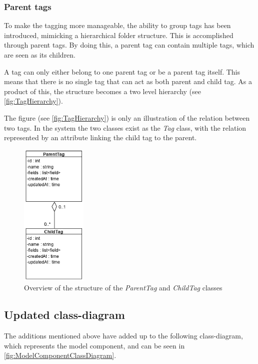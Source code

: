 \subsubsection{Parent tags}
To make the tagging more manageable, the ability to group tags has been introduced, mimicking a hierarchical folder structure. This is accomplished through parent tags. By doing this, a parent tag can contain multiple tags, which are seen as its children. 
\par
A tag can only either belong to one parent tag or be a parent tag itself. This means that there is no single tag that can act as both parent and child tag. As a product of this, the structure becomes a two level hierarchy (see \autoref{fig:TagHierarchy}). 
\par
The figure (see \autoref{fig:TagHierarchy}) is only an illustration of the relation between two tags. In the system the two classes exist as the \textit{Tag} class, with the relation represented by an attribute linking the child tag to the parent.

\begin{figure}[H]
    \centering
    \includegraphics[width=0.28\textwidth]{figures/Structures/TagHierarchy.png}
    \caption{Overview of the structure of the \textit{ParentTag} and \textit{ChildTag} classes}
    \label{fig:TagHierarchy}
\end{figure}

\newpage

\subsection{Updated class-diagram}
The additions mentioned above have added up to the following class-diagram, which represents the model component, and can be seen in \autoref{fig:ModelComponentClassDiagram}.

